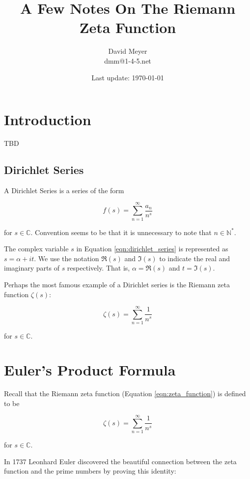 \documentclass[11pt, oneside]{article}   	%
\title{A Few Notes On The Riemann Zeta Function}
\author{David Meyer \\ dmm@1-4-5.net}
\date{Last update: \today}							%
\theoremstyle{definition}
\begin{document}
\maketitle

\section{Introduction}
TBD

\subsection{Dirichlet Series}
A Dirichlet Series \cite{mccarthy2018}  is a series of the form

\bigskip
\begin{equation}
f(s) = \sum\limits_{n = 1}^{\infty} \frac{a_n}{n^s}
\label{eqn:dirichlet_series}
\end{equation}

\bigskip
\noindent
for $s \in \mathbb{C}$. Convention seems to be that it is unnecessary to note that $n \in \mathbb{N}^*$.  

\bigskip
\noindent
The complex variable $s$ in Equation \ref{eqn:dirichlet_series} is represented as $s = \alpha + i t$. We use the 
notation $ \Re(s)$ and $\Im(s)$ to indicate the real and imaginary parts of $s$ respectively. That is, 
$\alpha = \Re(s)$ and $t = \Im(s)$.


\bigskip
\noindent
Perhaps the most famous example of a Dirichlet series is the Riemann zeta function $\zeta(s)$:

\bigskip
\begin{equation}
\zeta(s) = \sum^\infty_{n = 1} \frac{1}{n^s}
\label{eqn:zeta_function}
\end{equation}

\bigskip
\noindent
for $s \in \mathbb{C}$. 

\section{Euler's Product Formula}
Recall that the Riemann zeta function (Equation \ref{eqn:zeta_function}) is defined to be

\medskip
\begin{equation*}
\zeta(s) = \sum^\infty_{n = 1} \frac{1}{n^s}
\end{equation*}

\noindent
for $s \in \mathbb{C}$.

\bigskip
\noindent
In 1737 Leonhard Euler \cite{euler_product_formula} discovered the beautiful connection between the zeta function and the prime numbers by proving this identity:
\end{document}
